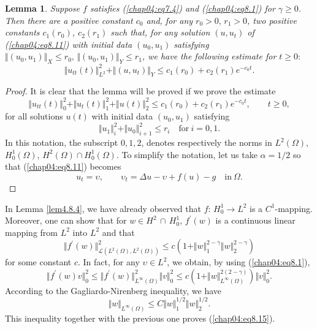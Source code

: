 \documentclass{surv-l}
\theoremstyle{plain}
\newtheorem{lemma}[theorem]{Lemma}
\theoremstyle{definition}
\numberwithin{equation}{section}
\numberwithin{figure}{chapter}
\begin{document}
\begin{lemma}\label{lem4.8.12} Suppose $f$ satisfies \emph{(\ref{chap04:eq7.4})} and \emph{(\ref{chap04:eq8.1})} for $\gamma\geq 0$. Then there are a positive constant $c_{0}$ and, for any $r_{0}>0,\, r_{1}>0$, two positive constants $c_{1}(r_{0})$, $c_{2}(r_{1})$ such that, for any solution $(u, u_{t})$ of \emph{(\ref{chap04:eq8.11})} with initial data $(u_{0}, u_{1})$ satisfying $\Vert(u_{0}, u_{1})\Vert_{X}\leq r_{0},\,\Vert(u_{0}, u_{1})\Vert_{Y}\leq r_{1}$, we have the following estimate for $t\geq 0:$
\begin{equation}\label{chap04:eq8.12}
\Vert u_{tt}(t)\Vert_{L^{2}}^{2}+\Vert(u, u_{t})\Vert_{Y}\leq c_{1}(r_{0})+c_{2}(r_{1})e^{-c_{0}t}.
\end{equation}
\end{lemma}
\begin{proof}
It is clear that the lemma will be proved if we prove the estimate
\begin{equation}\label{chap04:eq8.13}
\Vert u_{tt}(t)\Vert_{0}^{2}+\Vert u_{t}(t)\Vert_{1}^{2}+\Vert u(t)\Vert_{2}^{2}\leq c_{1}(r_{0})+c_{2}(r_{1})e^{-c_{0}t},\qquad t\geq 0,
\end{equation}
for all solutions $u(t)$ with initial data $(u_{0}, u_{1})$ satisfying
\begin{equation*}
\Vert u_{1}\Vert_{i}^{2}+\Vert u_{0}\Vert_{i+1}^{2}\leq r_{i}\quad \mathrm{for}\ i=0,1.
\end{equation*}
In this notation, the subscript $0,1,2$, denotes respectively the norms in $L^{2}(\Omega)$, $H_{0}^{1}(\Omega)$, $H^{2}(\Omega)\cap H_{0}^{1}(\Omega)$. To simplify the notation, let us take $\alpha=1/2$ so that (\ref{chap04:eq8.11}) becomes
\begin{equation}\label{chap04:eq8.14}
u_{t}=\upsilon,\qquad \upsilon_{t}=\Delta u-\upsilon+f(u)-g\quad \mathrm{in}\ \Omega.
\end{equation}
\end{proof}


In Lemma \ref{lem4.8.4}, we have already observed that $f$: $H_{0}^{1}\rightarrow L^{2}$ is a $C^{1}$-mapping. Moreover, one can show that for $w\in H^{2}\,\cap\, H_{0}^{1},\,f^{\prime}(w)$ is a continuous linear mapping from $L^{2}$ into $L^{2}$ and that
\begin{equation}\label{chap04:eq8.15}
\Vert f^{\prime}(w)\Vert_{\mathcal{L}(L^{2}(\Omega),L^{2}(\Omega))}^{2}\leq c(1+\Vert w\Vert_{1}^{2-\gamma}\Vert w\Vert_{2}^{2-\gamma})
\end{equation}
for some constant $c$. In fact, for any $\upsilon\in L^{2}$, we obtain, by using (\ref{chap04:eq8.1}),
\begin{equation*}
\Vert f^{\prime}(w)v\Vert_{0}^{2}\leq\Vert f^{\prime}(w)\Vert_{L^{\infty}(\Omega)}^{2}\Vert v\Vert_{0}^{2}\leq c(1+\Vert w\Vert_{L^{\infty}(\Omega)}^{2(2-\gamma)})\Vert v\Vert_{0}^{2}.
\end{equation*}
According to the Gagliardo-Nirenberg inequality, we have
\begin{equation*}
\Vert w\Vert_{L^{\infty}(\Omega)}\leq C\Vert w\Vert_{1}^{1/2}\Vert w\Vert_{2}^{1/2}.
\end{equation*}
This inequality together with the previous one proves (\ref{chap04:eq8.15}).
\end{document}
